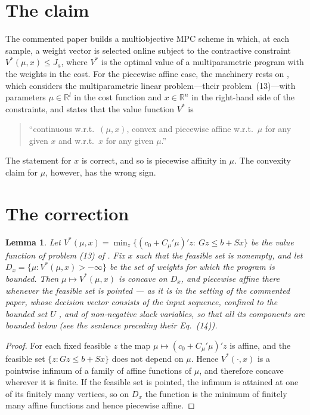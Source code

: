 \documentclass[review]{elsarticle}
\newtheorem{lemma}{Lemma}
\newcommand{\Rset}{\mathbb{R}}
\begin{document}
\section{The claim}
The commented paper \citep{bemporad2009} builds a multiobjective MPC scheme in
which, at each sample, a weight vector is selected online subject to the
contractive constraint $V^\ast(\mu,x)\le J_a$, where $V^\ast$ is the optimal
value of a multiparametric program with the weights in the cost. For the
piecewise affine case, the machinery rests on
\citep[Lemma~4]{bemporad2009}, which considers the multiparametric linear
problem---their problem~(13)---with parameters $\mu\in\Rset^l$ in the cost
function and $x\in\Rset^n$ in the right-hand side of the constraints, and
states that the value function $V^\ast$ is
\begin{quote}
``continuous w.r.t.\ $(\mu,x)$, convex and piecewise affine w.r.t.\ $\mu$ for
any given $x$ and w.r.t.\ $x$ for any given $\mu$.''
\end{quote}
The statement for $x$ is correct, and so is piecewise affinity in $\mu$. The
convexity claim for $\mu$, however, has the wrong sign.

\section{The correction}
\begin{lemma}\label{lem:concave}
Let $V^\ast(\mu,x)=\min_z\{(c_0+C_\mu'\mu)'z:\ Gz\le b+Sx\}$ be the value
function of problem (13) of \citep{bemporad2009}. Fix $x$ such that the
feasible set is nonempty, and let $D_x=\{\mu: V^\ast(\mu,x)>-\infty\}$ be the
set of weights for which the program is bounded. Then $\mu\mapsto
V^\ast(\mu,x)$ is concave on $D_x$, and piecewise affine there whenever the
feasible set is pointed --- as it is in the setting of the commented paper,
whose decision vector consists of the input sequence, confined to the bounded
set $U$ \citep[footnote~3]{bemporad2009}, and of non-negative slack variables,
so that all its components are bounded below (see the sentence preceding their
Eq.~(14)).
\end{lemma}

\begin{proof}
For each fixed feasible $z$ the map $\mu\mapsto(c_0+C_\mu'\mu)'z$ is affine,
and the feasible set $\{z:Gz\le b+Sx\}$ does not depend on $\mu$. Hence
$V^\ast(\cdot,x)$ is a pointwise infimum of a family of affine functions of
$\mu$, and therefore concave wherever it is finite. If the feasible set is
pointed, the infimum is attained at one of its finitely many vertices, so on
$D_x$ the function is the minimum of finitely many affine functions and hence
piecewise affine.
\end{proof}
\end{document}
